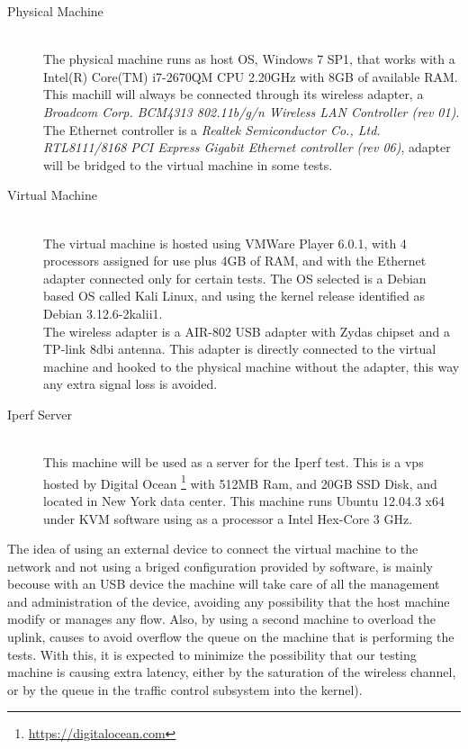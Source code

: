 \begin{description}

\item [Physical Machine] \hfill \\
The physical machine runs as host OS, Windows 7 SP1, that works with a Intel(R)
Core(TM) i7-2670QM CPU \@ 2.20GHz with 8GB of available RAM. This machill will 
always be connected through its wireless adapter, a \textit{Broadcom Corp. 
BCM4313 802.11b/g/n Wireless LAN Controller (rev 01)}. The Ethernet controller 
is a \textit{Realtek Semiconductor Co., Ltd. RTL8111/8168 PCI Express Gigabit 
Ethernet controller (rev 06)}, adapter will be bridged to the virtual 
machine in some tests.\\

\item[Virtual Machine] \hfill \\
The virtual machine is hosted using VMWare Player 6.0.1, with 4 processors 
assigned for use plus 4GB of RAM, and with the Ethernet adapter connected only
for certain tests. The OS selected is a Debian based OS called Kali Linux, and
using the kernel release identified as Debian 3.12.6-2kalii1.\\

The wireless adapter is a AIR-802 USB adapter with Zydas chipset and a TP-link 
8dbi antenna. This adapter is directly connected to the virtual machine and 
hooked to the physical machine without the adapter, this way any extra signal 
loss is avoided. \\

\item[Iperf Server] \hfill \\
This machine will be used as a server for the Iperf test. This is a vps hosted 
by Digital Ocean \footnote{\url{https://digitalocean.com}} with 512MB Ram, and 
20GB SSD Disk, and located in New York data center. This machine runs Ubuntu 
12.04.3 x64 under KVM software using as a processor a Intel Hex-Core 3 GHz.

\end{description}

The idea of using an external device to connect the virtual machine to the 
network and not using a briged configuration provided by software, is mainly 
becouse with an USB device the machine will take care of all the management and 
administration of the device, avoiding any possibility that the host machine 
modify or manages any flow. Also, by using a second machine to overload the 
uplink, causes to avoid overflow the queue on the machine that is performing 
the tests. With this, it is expected to minimize the possibility that our 
testing machine is causing extra latency, either by the saturation of the 
wireless channel, or by the queue in the traffic control subsystem into the 
kernel). \\

